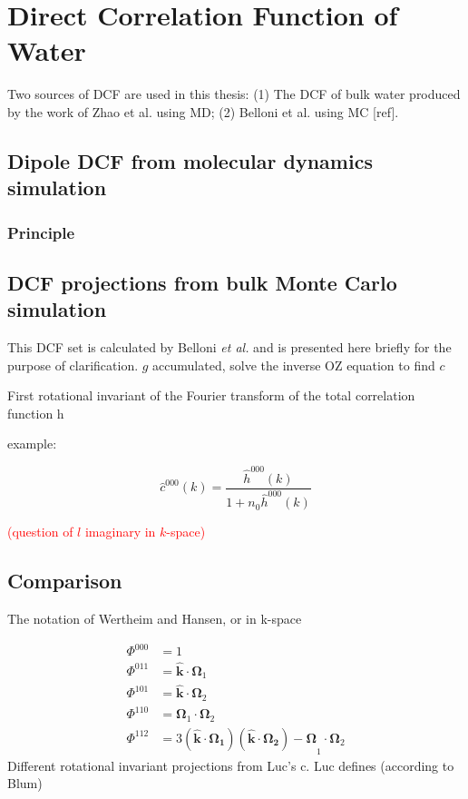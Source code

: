 
\chapter{Direct Correlation Function of Water\label{chpt:dcf-water}}

Two sources of DCF are used in this thesis: (1) The \acs{DCF} of bulk
water produced by the work of Zhao et al. using MD; (2) Belloni et
al. using MC {[}ref{]}.

\section{Dipole DCF from molecular dynamics simulation}

\subsection{Principle}

\section{DCF projections from bulk Monte Carlo simulation}

This DCF set is calculated by Belloni \textit{et al.} \citep{Luc_2012}
and is presented here briefly for the purpose of clarification. $g$
accumulated, solve the inverse OZ equation to find $c$

First rotational invariant of the Fourier transform of the total correlation
function h

example:

\[
\hat{c}^{000}(k)=\frac{\hat{h}^{000}(k)}{1+n_{0}\hat{h}^{000}(k)}
\]

\textcolor{red}{(question of $l$ imaginary in $k$-space)}

\section{Comparison}

The notation of Wertheim and Hansen, or in k-space

\begin{align}
\Phi^{000} & =1\nonumber \\
\Phi^{011} & =\hat{\mathbf{k}}\cdot\mathbf{\Omega}_{1}\nonumber \\
\Phi^{101} & =\hat{\mathbf{k}}\cdot\mathbf{\Omega}_{2}\nonumber \\
\Phi^{110} & =\mathbf{\Omega}_{1}\cdot\mathbf{\Omega}_{2}\\
\Phi^{112} & =3\mathbf{(\hat{\mathbf{k}}\cdot\mathbf{\Omega}_{1})(\hat{\mathbf{k}}\cdot\mathbf{\Omega}_{2})-\Omega}_{1}\cdot\mathbf{\Omega}_{2}\nonumber 
\end{align}
Different rotational invariant projections from Luc’s c. Luc defines
(according to Blum)

